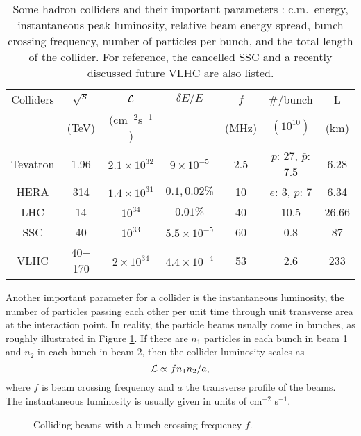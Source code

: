 \documentclass[prd,aps,floats,preprintnumbers,preprint,superscriptaddress,floatfix,nofootinbib]{revtex4}
\def\be{\begin{equation}}
\def\ee{\end{equation}}
\begin{document}
%
\begin{table}[tb]
    \begin{tabular}[t]{|c| c | c | c |c|c|c|}
       \hline
        Colliders  & $\sqrt s$& ${\cal{L}}$& $\delta E/E$ & $f$ & $\#$/bunch & L\\
          & (TeV) &  (cm$^{-2}$s$^{-1}$)&  & (MHz)& $(10^{10})$ & (km)\\
        \hline        \hline
        Tevatron & 1.96   &     $2.1\times 10^{32}$   &  $9\times 10^{-5}$  & 2.5 & $p$: 27, 
        $\bar p$: 7.5& 6.28\\
        HERA &  314  & $1.4\times 10^{31}$   &  $0.1,0.02\%$ &10  & $e$: 3, $p$: 7& 6.34 \\
        \hline    \hline
        LHC & 14   &   $10^{34}$   & $0.01\%$ & 40 & 10.5& 26.66\\        
        \hline
         SSC & 40   &   $10^{33}$   & $5.5\times 10^{-5}$ & 60 & 0.8 & 87\\        
        VLHC    & 40$-$170  & $2\times10^{34}$ & $4.4\times 10^{-4}$ & 53 & 2.6 & 233 \\
\hline
    \end{tabular}
\caption{Some hadron colliders and their important parameters 
{\protect \cite{PDG}}: c.m.~energy, instantaneous
peak luminosity, relative beam energy spread, bunch crossing frequency, 
number of particles per bunch, and the total length of the collider. For
reference, the cancelled SSC and a recently discussed future VLHC {\protect \cite{vlhc}}
are also listed. }
\label{hcolliders} 
\end{table}

Another important parameter for a collider is the instantaneous luminosity, 
the number of particles passing each other  per unit time through unit 
transverse area at the interaction point.  In reality, 
the particle  beams usually come in bunches, as roughly illustrated in
Figure \ref{fig:collider}. If there are $n_1$ particles in each bunch
in beam 1 and $n_2$ in each bunch in beam 2, then the collider luminosity scales as
\be
{\cal{L}} \propto f n_1 n_2/a,
\ee
where $f$ is beam crossing frequency and $a$ the transverse profile of the 
beams. The instantaneous luminosity is usually given in units of cm$^{-2}$ s$^{-1}$. 

\begin{figure}[h]
\caption{Colliding beams  with a bunch crossing frequency $f$.
\label{fig:collider}}
\end{figure}
\end{document}
